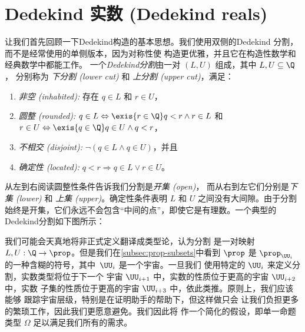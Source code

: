 \section{Dedekind 实数 (Dedekind reals)}
\label{sec:dedekind-reals}

%
让我们首先回顾一下Dedekind构造的基本思想。我们使用双侧的Dedekind
分割，而不是经常使用的单侧版本，因为对称性使
构造更优雅，并且它在构造性数学和经典数学中都能工作。
%
一个\emph{Dedekind分割}由一对 $(L, U)$ 组成，其中 $L, U \subseteq \Q$，
分别称为
\emph{下分割 (lower cut)} 和 \emph{上分割 (upper cut)}，满足：
%
\begin{enumerate}
  \item \emph{非空 (inhabited):} 存在 $q \in L$ 和 $r \in U$，
  \item \emph{圆整 (rounded):} $q \in L \Leftrightarrow \exis {r \in \Q} q < r \land r \in L$
  和 $r \in U \Leftrightarrow \exis {q \in \Q} q \in U \land q < r$，
  \item \emph{不相交 (disjoint):} $\lnot (q \in L \land q \in U)$，并且
  \item \emph{确定性 (located):} $q < r \Rightarrow q \in L \lor r \in U$。
\end{enumerate}
%
从左到右阅读圆整性条件告诉我们分割是\emph{开集 (open)}，
%
而从右到左它们分别是\emph{下集 (lower)} 和 \emph{上集 (upper)}。确定性条件表明 $L$ 和 $U$ 之间没有大间隙。由于分割始终是开集，它们永远不会包含“中间的点”，即使它是有理数。一个典型的Dedekind分割如下图所示：
%
\begin{center}
\end{center}
%
我们可能会天真地将非正式定义翻译成类型论，认为分割
是一对映射 $L, U : \Q \to \prop$。但是我们在\cref{subsec:prop-subsets}中看到
$\prop$ 是 $\prop_{\UU_i}$ 的一种含糊的符号，其中~$\UU_i$ 是一个宇宙。一旦我们
使用特定的 $\UU_i$ 来定义分割，实数类型将位于下一个
宇宙 $\UU_{i+1}$ 中，实数的性质位于更高的宇宙 $\UU_{i+2}$ 中，实数
子集的性质位于更高的宇宙 $\UU_{i+3}$ 中，依此类推。原则上，我们应该能够
跟踪宇宙层级，特别是在证明助手的帮助下，但这样做只会
让我们负担更多的繁琐工作，因此我们更愿意避免。我们因此将
作一个简化的假设，即单一命题类型 $\Omega$ 足以满足我们所有的需求。

